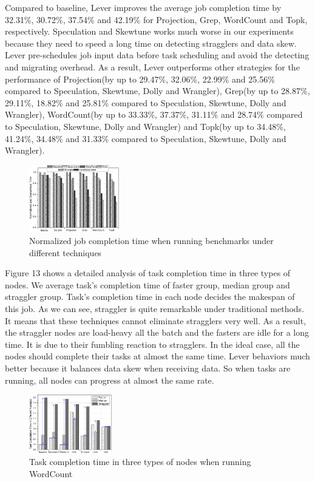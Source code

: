 \documentclass[10pt,conference,compsocconf,letterpaper]{IEEEtran}
\begin{document}
  Compared to baseline, Lever improves the average job completion time by 32.31\%, 30.72\%, 37.54\% and 42.19\% for Projection, Grep, WordCount and Topk, respectively. Speculation and Skewtune works much worse in our experiments because they need to speed a long time on detecting stragglers and data skew. Lever pre-schedules job input data before task scheduling and avoid the detecting and migrating overhead. As a result, Lever outperforms other strategies for the performance of Projection(by up to 29.47\%, 32.06\%, 22.99\% and 25.56\% compared to Speculation, Skewtune, Dolly and Wrangler), Grep(by up to 28.87\%, 29.11\%, 18.82\% and 25.81\% compared to Speculation, Skewtune, Dolly and Wrangler), WordCount(by up to 33.33\%, 37.37\%, 31.11\% and 28.74\% compared to Speculation, Skewtune, Dolly and Wrangler) and Topk(by up to 34.48\%, 41.24\%, 34.48\% and 31.33\% compared to Speculation, Skewtune, Dolly and Wrangler).
  \begin{figure}[htbp]
    \centering
    \includegraphics[width=0.35\textwidth]{FigureJCT}
    \caption{Normalized job completion time when running benchmarks under different techniques}
    \label{Fig. 12:}
  \end{figure}

  Figure 13 shows a detailed analysis of task completion time in three types of nodes. We average task's completion time of faster group, median group and straggler group. Task's completion time in each node decides the makespan of this job. As we can see, straggler is quite remarkable under traditional methods. It means that these techniques cannot eliminate stragglers very well. As a result, the straggler nodes are load-heavy all the batch and the fasters are idle for a long time. It is due to their fumbling reaction to stragglers. In the ideal case, all the nodes should complete their tasks at almost the same time. Lever behaviors much better because it balances data skew when receiving data. So when tasks are running, all nodes can progress at almost the same rate.
  \begin{figure}[htbp]
    \centering
    \includegraphics[width=0.32\textwidth]{FigureMakeSpan}
    \caption{Task completion time in three types of nodes when running WordCount}
    \label{Fig. 13:}
  \end{figure}
\end{document}
